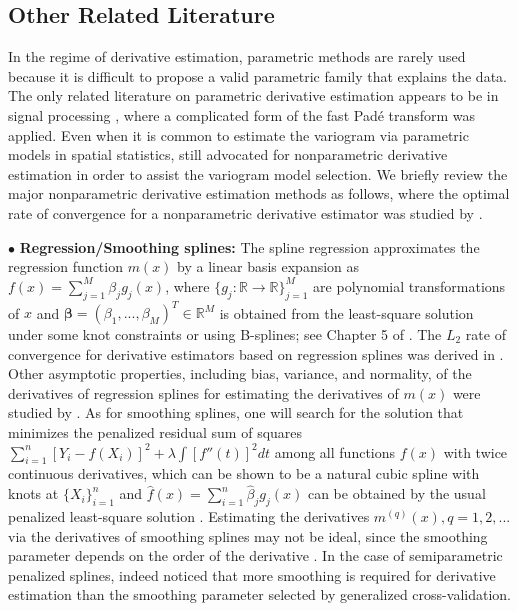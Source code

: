 \documentclass{uwstat572}
\theoremstyle{definition}
\renewcommand{\hat}{\widehat}
\theoremstyle{theorem}
\begin{document}
\subsection{Other Related Literature}
\label{Sec:related_work}

In the regime of derivative estimation, parametric methods are rarely used because it is difficult to propose a valid parametric family that explains the data. The only related literature on parametric derivative estimation appears to be in signal processing \citep{belkic2018validation}, where a complicated form of the fast Pad\'e transform was applied. Even when it is common to estimate the variogram via parametric models in spatial statistics, \cite{gorsich2000variogram} still advocated for nonparametric derivative estimation in order to assist the variogram model selection. We briefly review the major nonparametric derivative estimation methods as follows, where the optimal rate of convergence for a nonparametric derivative estimator was studied by \cite{stone1980optimal,stone1982optimal}. 

$\bullet$ {\bf Regression/Smoothing splines:} The spline regression \citep{deboor1968splines} approximates the regression function $m(x)$ by a linear basis expansion as $f(x) = \sum_{j=1}^M \beta_j g_j(x)$, where $\{g_j:\mathbb{R}\to \mathbb{R}\}_{j=1}^M$ are polynomial transformations of $x$ and $\bm{\beta} = (\beta_1,...,\beta_M)^T \in \mathbb{R}^M$ is obtained from the least-square solution under some knot constraints or using B-splines; see Chapter 5 of \cite{hastie2009elements}. The $L_2$ rate of convergence for derivative estimators based on regression splines was derived in \cite{stone1985additive}. Other asymptotic properties, including bias, variance, and normality, of the derivatives of regression splines for estimating the derivatives of $m(x)$ were studied by \cite{zhou2000derivative}. As for smoothing splines, one will search for the solution that minimizes the penalized residual sum of squares $\sum_{i=1}^n \left[Y_i-f(X_i)\right]^2 + \lambda \int \left[f''(t)\right]^2 dt$ among all functions $f(x)$ with twice continuous derivatives, which can be shown to be a natural cubic spline with knots at $\{X_i\}_{i=1}^n$ and $\hat{f}(x)=\sum_{i=1}^n \hat{\beta}_j g_j(x)$ can be obtained by the usual penalized least-square solution \citep{hastie2009elements}. Estimating the derivatives $m^{(q)}(x), q=1,2,...$ via the derivatives of smoothing splines may not be ideal, since the smoothing parameter depends on the order of the derivative \citep{wahba1990optimal}. In the case of semiparametric penalized splines, \cite{jarrow2004estimating} indeed noticed that more smoothing is required for derivative estimation than the smoothing parameter selected by generalized cross-validation.
\end{document}
